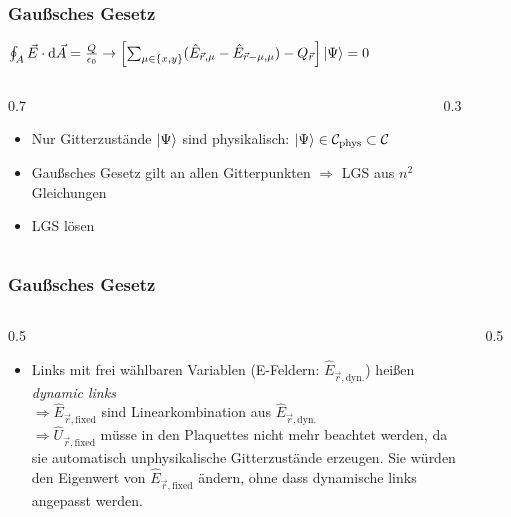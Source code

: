 \documentclass{beamer}
\begin{document}
\begin{frame}
	\frametitle{Gaußsches Gesetz}
	$\oint_A \vec{E} \cdot \text{d}\vec{A}=\frac{Q}{\epsilon_0} \rightarrow \left[\sum_{\mu\in\{x, y\}}(\hat{E}_{\vec{r}, \mu}-\hat{E}_{\vec{r}-\mu, \mu})-Q_{\vec{r}}\right]\ket{\Psi}=0$

	\begin{columns}
		\begin{column}{0.7\textwidth}
			\begin{itemize}
				\item Nur Gitterzustände $\ket{\Psi}$ sind physikalisch: $\ket{\Psi}\in\mathcal{C}_\text{phys}\subset\mathcal{C}$
				\item Gaußsches Gesetz gilt an allen Gitterpunkten $\Rightarrow$ LGS aus $n^2$ Gleichungen
				\item LGS lösen
			\end{itemize}
		\end{column}

		\begin{column}{0.3\textwidth}
			\begin{figure}
				
			\end{figure}
		\end{column}
	\end{columns}
\end{frame}

\begin{frame}
	\frametitle{Gaußsches Gesetz}
	\begin{columns}
		\begin{column}{0.5\textwidth}
			\begin{itemize}
        \item Links mit frei wählbaren Variablen (E-Feldern: $\hat{E}_{\vec{r}, \text{dyn.}}$) heißen \textit{dynamic links}\\\vspace{10pt}
				$\Rightarrow \hat{E}_{\vec{r}, \text{fixed}}$ sind Linearkombination aus $\hat{E}_{\vec{r}, \text{dyn.}}$\\\vspace{5pt}
				$\Rightarrow \hat{U}_{\vec{r}, \text{fixed}}$ müsse in den Plaquettes nicht mehr beachtet werden, da sie automatisch unphysikalische Gitterzustände erzeugen. Sie würden den Eigenwert von $\hat{E}_{\vec{r}, \text{fixed}}$ ändern, ohne dass dynamische links angepasst werden.
			\end{itemize}
		\end{column}
		\begin{column}{0.5\textwidth}
			\begin{figure}
				
			\end{figure}
		\end{column}
	\end{columns}
\end{frame}
\end{document}

